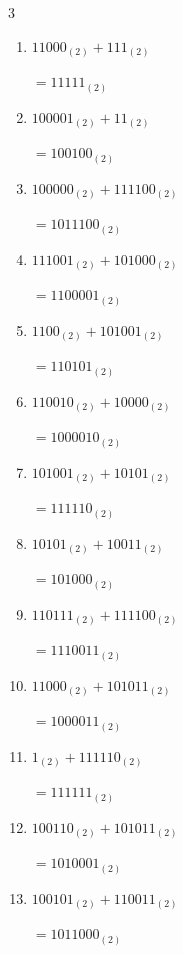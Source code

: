 \begin{multicols}{3}
\begin{enumerate}
        $=11101_{(2)}$

  \item $11000_{(2)} + 111_{(2)}$

        $=11111_{(2)}$

\columnbreak %

\resetques

  \item $100001_{(2)} + 11_{(2)}$

        $=100100_{(2)}$

  \item $100000_{(2)} + 111100_{(2)}$

        $=1011100_{(2)}$

  \item $111001_{(2)} + 101000_{(2)}$

        $=1100001_{(2)}$

  \item $1100_{(2)} + 101001_{(2)}$

        $=110101_{(2)}$

  \item $110010_{(2)} + 10000_{(2)}$

        $=1000010_{(2)}$

  \item $101001_{(2)} + 10101_{(2)}$

        $=111110_{(2)}$

  \item $10101_{(2)} + 10011_{(2)}$

        $=101000_{(2)}$

  \item $110111_{(2)} + 111100_{(2)}$

        $=1110011_{(2)}$

  \item $11000_{(2)} + 101011_{(2)}$

        $=1000011_{(2)}$

  \item $1_{(2)} + 111110_{(2)}$

        $=111111_{(2)}$

\columnbreak %

  \item $100110_{(2)} + 101011_{(2)}$

        $=1010001_{(2)}$

  \item $100101_{(2)} + 110011_{(2)}$

        $=1011000_{(2)}$


\end{enumerate}
\end{multicols}
